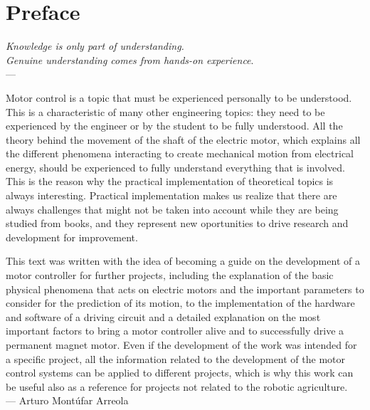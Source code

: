 

\chapter*{Preface}
\begin{flushright}{\slshape    
   Knowledge is only part of understanding.\\
   Genuine understanding comes from hands-on experience}.
   \\ \medskip --- \citeauthor{constructionism}
    \citeyear{constructionism}
\end{flushright} 

Motor control is a topic that must be experienced personally to be understood. This is a characteristic of many other engineering topics: they need to be experienced by the engineer or by the student to be fully understood. All the theory behind the movement of the shaft of the electric motor, which explains all the different phenomena interacting to create mechanical motion from electrical energy, should be experienced to fully understand everything that is involved. This is the reason why the practical implementation of theoretical topics is always interesting. Practical implementation makes us realize that there are always challenges that might not be taken into account while they are being studied from books, and they represent new oportunities to drive research and development for improvement.

This text was written with the idea of becoming a guide on the development of a motor controller for further projects, including the explanation of the basic physical phenomena that acts on electric motors and the important parameters to consider for the prediction of its motion, to the implementation of the hardware and software of a driving circuit and a detailed explanation on the most important factors to bring a motor controller alive and to successfully drive a permanent magnet motor. Even if the development of the work was intended for a specific project, all the information related to the development of the motor control systems can be applied to different projects, which is why this work can be useful also as a reference for projects not related to the robotic agriculture.\\

--- Arturo Mont\'ufar Arreola